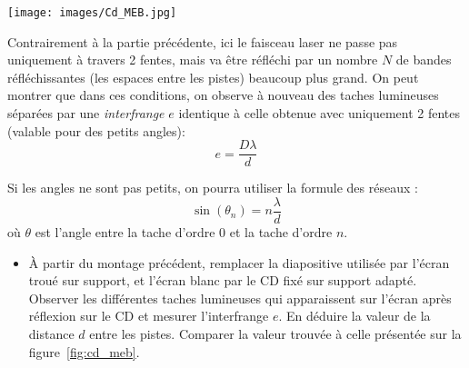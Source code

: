 \documentclass{tp}
\begin{document}
\begin{center}
\end{center}


\begin{center}
  \texttt{[image: images/Cd\_MEB.jpg]}
  \label{fig:cd_meb}
\end{center}

Contrairement à la partie précédente, ici le faisceau laser ne passe pas uniquement à travers 2 fentes, mais va être réfléchi par un nombre $N$ de bandes réfléchissantes (les espaces entre les pistes) beaucoup plus grand. On peut montrer que dans ces conditions, on observe à nouveau des taches lumineuses séparées par une \emph{interfrange}  $e$ identique à celle obtenue avec uniquement 2 fentes (valable pour des petits angles):
\begin{equation*}
  e = \frac{D\lambda}{d}
\end{equation*}

Si les angles ne sont pas petits, on pourra utiliser la formule des réseaux :
\[ \sin(\theta_n) = n \frac{\lambda}{d}  \]
où $\theta$ est l'angle entre la tache d'ordre $0$ et la tache d'ordre $n$. 

\begin{itemize}
  \item À partir du montage précédent, remplacer la diapositive utilisée par l’écran troué sur support, et l’écran blanc par le CD fixé sur support adapté. Observer les différentes taches lumineuses qui apparaissent sur l'écran après réflexion sur le CD et mesurer l'interfrange $e$. En déduire la valeur de la distance $d$ entre les pistes. Comparer la valeur trouvée à celle présentée sur la figure~\ref{fig:cd_meb}.

\end{itemize}
\end{document}

